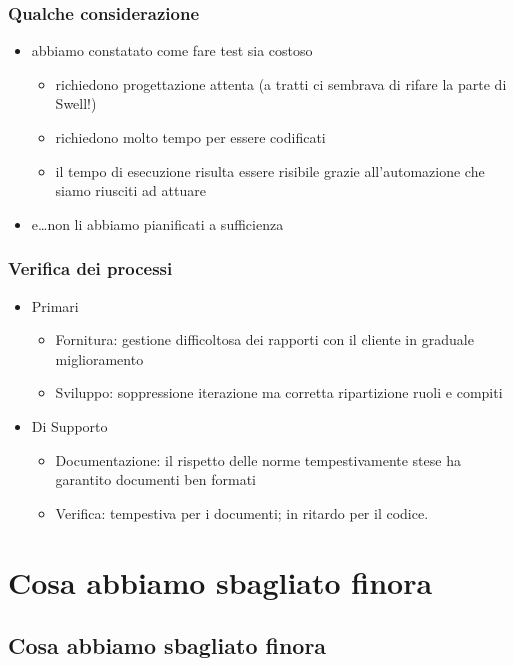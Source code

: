 \begin{frame}
\frametitle{Qualche considerazione}

\begin{itemize}
\item abbiamo constatato come fare test sia costoso
\begin{itemize}
\item richiedono progettazione attenta (a tratti ci sembrava di rifare la parte di Swell!)
\item richiedono molto tempo per essere codificati
\item il tempo di esecuzione risulta essere risibile grazie all'automazione che siamo riusciti ad attuare
\end{itemize}

\item e\ldots non li abbiamo pianificati a sufficienza
\end{itemize}


\end{frame}

\begin{frame}
\frametitle{Verifica dei processi}

\begin{itemize}
\item Primari
	\begin{itemize}
		\item Fornitura: gestione difficoltosa dei rapporti con il cliente in graduale miglioramento
		\item Sviluppo: soppressione iterazione ma corretta ripartizione ruoli e compiti
	\end{itemize}
	\item Di Supporto
	\begin{itemize}
		\item Documentazione: il rispetto delle norme tempestivamente stese ha garantito documenti ben formati
		\item Verifica: tempestiva per i documenti; in ritardo per il codice.
	\end{itemize}
\end{itemize}




\end{frame}

\section{Cosa abbiamo sbagliato finora}

\subsection*{Cosa abbiamo sbagliato finora}

